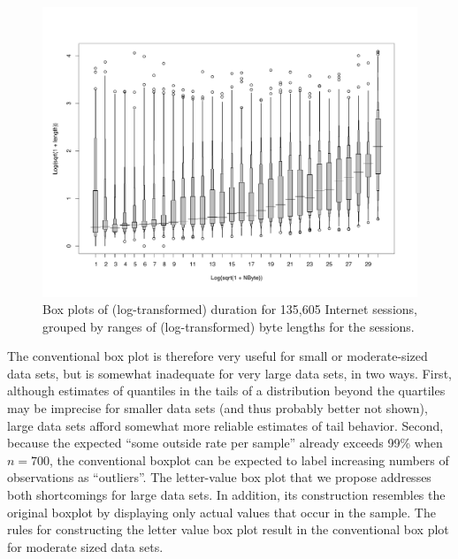 \documentclass[oneside]{article}
\begin{document}
\begin{figure}[hbtp]
  \centering
  \includegraphics[scale=.5,angle=270]{lvbox2}

  \caption{Box plots of (log-transformed) duration for
  135,605 Internet sessions, grouped by ranges of (log-transformed) byte
  lengths for the sessions.}
  \label{kkewbox} 
\end{figure}

The conventional box plot is therefore very useful for 
small or moderate-sized data sets, but is somewhat inadequate
for very large data sets, in two ways.  First, although
estimates of quantiles in the tails of a distribution 
beyond the quartiles may be imprecise for smaller data sets
(and thus probably better not shown), large data sets 
afford somewhat more reliable estimates of tail behavior.  
Second, because the expected ``some outside rate per sample''
already exceeds 99\% when $n = 700$,
the conventional boxplot can be expected to label
increasing numbers of observations as ``outliers''.
The letter-value box plot that we propose
addresses both shortcomings for large data sets.
In addition, its construction resembles the original 
boxplot by displaying only actual values that occur in 
the sample.  The rules for constructing the letter value
box plot result in the conventional box plot for moderate 
sized data sets.
\end{document}
